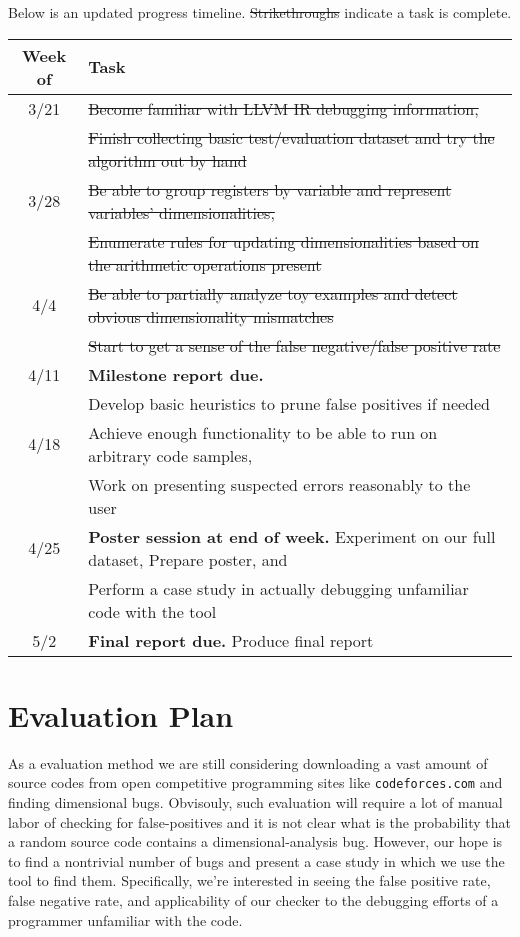 \documentclass[12pt]{article}
\begin{document}
Below is an updated progress timeline.
\sout{Strikethroughs} indicate a task is complete.

\noindent
\begin{tabular}{c | l}
Week of & Task \\
\hline
3/21 & \sout{Become familiar with LLVM IR debugging information,} \\
& \sout{Finish collecting basic test/evaluation dataset and try the algorithm out by hand} \\
3/28 & \sout{Be able to group registers by variable and represent variables' dimensionalities,} \\
& \sout{Enumerate rules for updating dimensionalities based on the arithmetic operations present} \\
4/4 & \sout{Be able to partially analyze toy examples and detect obvious dimensionality mismatches} \\
& \sout{Start to get a sense of the false negative/false positive rate} \\
4/11 & \textbf{Milestone report due.} \\
& Develop basic heuristics to prune false positives if needed \\
4/18 & Achieve enough functionality to be able to run on arbitrary code samples, \\
& Work on presenting suspected errors reasonably to the user \\
4/25 & \textbf{Poster session at end of week.} Experiment on our full dataset, Prepare poster, and \\
& Perform a case study in actually debugging unfamiliar code with the tool \\
5/2 & \textbf{Final report due.} Produce final report
\end{tabular}

\section{Evaluation Plan}

As a evaluation method we are still considering downloading a vast amount of source codes from open competitive programming sites like \texttt{codeforces.com} and finding dimensional bugs.
Obvisouly, such evaluation will require a lot of manual labor of checking for false-positives and it is not clear what is the probability that a random source code contains a dimensional-analysis bug. However, our hope is to find a nontrivial number of bugs and present a case study in which we use the tool to find them.
Specifically, we're interested in seeing the false positive rate, false negative rate, and applicability of our checker to the debugging efforts of a programmer unfamiliar with the code.
\end{document}
